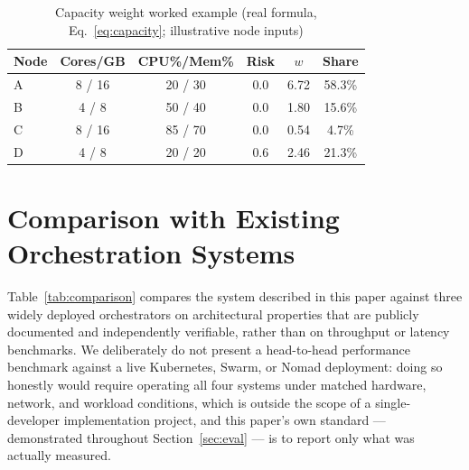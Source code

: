 \documentclass[conference]{IEEEtran}
\begin{document}
\begin{table}[t]
\caption{Capacity weight worked example (real formula, Eq.~\ref{eq:capacity}; illustrative node inputs)}
\label{tab:capacity}
\centering
\small
\begin{tabular}{@{}lccccc@{}}
\toprule
\textbf{Node} & \textbf{Cores/GB} & \textbf{CPU\%/Mem\%} & \textbf{Risk} & \textbf{$w$} & \textbf{Share} \\
\midrule
A & 8 / 16 & 20 / 30 & 0.0 & 6.72 & 58.3\% \\
B & 4 / 8  & 50 / 40 & 0.0 & 1.80 & 15.6\% \\
C & 8 / 16 & 85 / 70 & 0.0 & 0.54 & 4.7\% \\
D & 4 / 8  & 20 / 20 & 0.6 & 2.46 & 21.3\% \\
\bottomrule
\end{tabular}
\end{table}

\section{Comparison with Existing Orchestration Systems}
\label{sec:comparison}

Table~\ref{tab:comparison} compares the system described in this paper against three widely deployed
orchestrators on architectural properties that are publicly documented and independently verifiable,
rather than on throughput or latency benchmarks. We deliberately do not present a head-to-head
performance benchmark against a live Kubernetes, Swarm, or Nomad deployment: doing so honestly would
require operating all four systems under matched hardware, network, and workload conditions, which is
outside the scope of a single-developer implementation project, and this paper's own standard —
demonstrated throughout Section~\ref{sec:eval} — is to report only what was actually measured.
\end{document}
